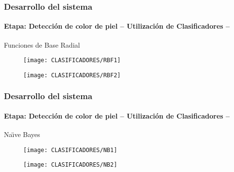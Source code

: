 \documentclass[xcolor=dvipsnames]{beamer}
\begin{document}
	\begin{frame}
		\transdissolve
		\frametitle{Desarrollo del sistema}
		\framesubtitle{Etapa: Detección de color de piel -- Utilización de Clasificadores -- }
		Funciones de Base Radial
		\begin{center}
			\begin{minipage}[c]{.45\textwidth}
				\begin{figure}[h]
					\texttt{[image: CLASIFICADORES/RBF1]}
				\end{figure}
			\end{minipage}
			\begin{minipage}[c]{.45\textwidth}
				\begin{figure}[h]
					\texttt{[image: CLASIFICADORES/RBF2]}
				\end{figure}
			\end{minipage}
		\end{center}
	\end{frame}

	\begin{frame}
		\transdissolve
		\frametitle{Desarrollo del sistema}
		\framesubtitle{Etapa: Detección de color de piel -- Utilización de Clasificadores -- }
		Na\"{\i}ve Bayes
		\begin{center}
			\begin{minipage}[c]{.45\textwidth}
				\begin{figure}[h]
					\texttt{[image: CLASIFICADORES/NB1]}
				\end{figure}
			\end{minipage}
			\begin{minipage}[c]{.45\textwidth}
				\begin{figure}[h]
					\texttt{[image: CLASIFICADORES/NB2]}
				\end{figure}
			\end{minipage}
		\end{center}
	\end{frame}
\end{document}
